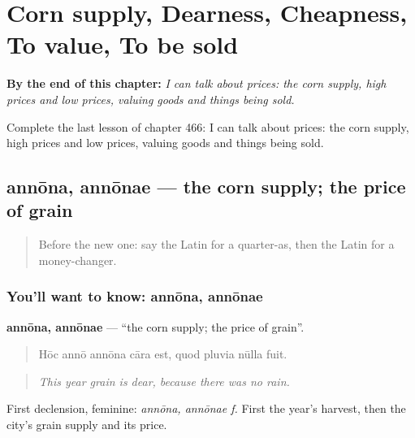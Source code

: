 
\chapter{Corn supply, Dearness, Cheapness, To value, To be sold}
\label{ch:la-corn-supply-dearness-cheapness-to-value-to-be-sold}

\begin{chapteropening}
\textbf{By the end of this chapter:} \emph{I can talk about prices: the corn supply, high prices and low prices, valuing goods and things being sold.}

Complete the last lesson of chapter 466: I can talk about prices: the corn supply, high prices and low prices, valuing goods and things being sold.
\end{chapteropening}

\section[annōna, annōnae]{annōna, annōnae — the corn supply; the price of grain}

\label{lesson:LA-C466-annona}



\begin{quote}
Before the new one: say the Latin for a quarter-as, then the Latin for a money-changer.
\end{quote}

\subsection*{You'll want to know: annōna, annōnae}
\textbf{annōna, annōnae} — \textquotedblleft{}the corn supply; the price of grain\textquotedblright{}.

\begin{quote}
Hōc annō annōna cāra est, quod pluvia nūlla fuit.
\end{quote}

\begin{quote}
\emph{This year grain is dear, because there was no rain.}
\end{quote}

First declension, feminine: \emph{annōna, annōnae f.} First the year's harvest, then the city's grain supply and its price.

